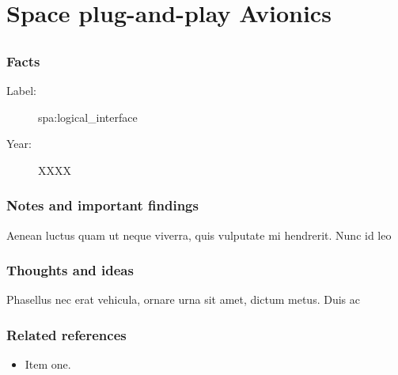\chapter{Space plug-and-play Avionics}

\section{}

\subsection{Facts}
\begin{description}
    \item[Label:] spa:logical\_interface \cite{spa:logical_interface}
    \item[Year:] XXXX
\end{description}

\subsection{Notes and important findings}
Aenean luctus quam ut neque viverra, quis vulputate mi hendrerit. Nunc id leo

\subsection{Thoughts and ideas}
Phasellus nec erat vehicula, ornare urna sit amet, dictum metus. Duis ac

\subsection{Related references}
\begin{itemize}
    \item Item one.
\end{itemize}
